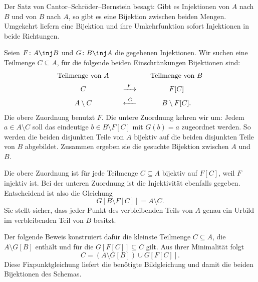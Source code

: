 Der Satz von Cantor--Schröder--Bernstein besagt: Gibt es Injektionen
von \(A\) nach \(B\) und von \(B\) nach \(A\), so gibt es eine
Bijektion zwischen beiden Mengen. Umgekehrt liefern eine Bijektion und
ihre Umkehrfunktion sofort Injektionen in beide Richtungen.

Seien \(F\colon A\inj B\) und \(G\colon B\inj A\) die gegebenen
Injektionen. Wir suchen eine Teilmenge \(C\subseteq A\), für die folgende
beiden Einschränkungen Bijektionen sind:
\[
  \begin{array}{c@{\qquad}c@{\qquad}c}
    \text{Teilmenge von }A && \text{Teilmenge von }B\\[4pt]
    C & \xrightarrow{\ F\ } & F[C]\\[5pt]
    A\setminus C & \xleftarrow{\ G\ } & B\setminus F[C].
  \end{array}
\]
Die obere Zuordnung benutzt \(F\). Die untere Zuordnung kehren wir um:
Jedem \(a\in A\setminus C\) soll das eindeutige
\(b\in B\setminus F[C]\) mit \(G(b)=a\) zugeordnet werden.
So werden die beiden disjunkten Teile von \(A\) bijektiv auf die beiden
disjunkten Teile von \(B\) abgebildet. Zusammen ergeben sie die gesuchte
Bijektion zwischen \(A\) und \(B\).

Die obere Zuordnung ist für jede Teilmenge \(C\subseteq A\) bijektiv
auf \(F[C]\), weil \(F\) injektiv ist. Bei der unteren Zuordnung
ist die Injektivität ebenfalls gegeben. Entscheidend ist also die Gleichung
\[
  G[B\setminus F[C]]=A\setminus C.
\]
Sie stellt sicher, dass jeder Punkt des verbleibenden Teils von \(A\)
genau ein Urbild im verbleibenden Teil von \(B\) besitzt.

Der folgende Beweis konstruiert dafür die kleinste Teilmenge
\(C\subseteq A\), die \(A\setminus G[B]\) enthält und für die
\(G[F[C]]\subseteq C\) gilt. Aus ihrer Minimalität folgt
\[
  C=(A\setminus G[B])\cup G[F[C]].
\]
Diese Fixpunktgleichung liefert die benötigte Bildgleichung und damit
die beiden Bijektionen des Schemas.
